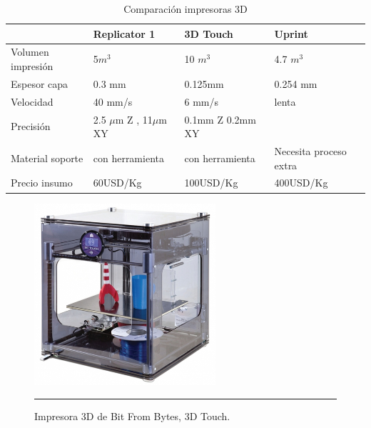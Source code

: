 \begin{table}\small 
    \begin{tabular}{l|lll}
    ~                     & Replicator 1                          & 3D Touch                   & Uprint      \\ \hline
    Volumen impresión         & 5$ m^{3} $                            & 10 $m^{3}$                 & 4.7 $m^{3}$ \\
    Espesor capa      & 0.3 mm                                & 0.125mm                    & 0.254 mm    \\
    Velocidad                 & 40 mm/s                               & 6 mm/s                     & lenta       \\
    Precisión & 2.5 $ \mu $m Z , 11$\mu$m XY  & 0.1mm Z  0.2mm XY  & ~           \\
    Material soporte  & con herramienta &con herramienta  & Necesita proceso extra      \\
    Precio insumo   &60USD/Kg	                          &           100USD/Kg         & 400USD/Kg        \\
    
    \end{tabular}
    \caption {Comparación impresoras 3D}
\end{table}

\begin{figure}[htbp]
	\centering
		\includegraphics[width=0.6\textwidth]{./Figures/3dtouch.jpg}
		\rule{35em}{0.5pt}
	\caption[3DTouch]{Impresora 3D de Bit From Bytes, 3D Touch.}
	\label{fig:3Dtouch}
\end{figure}	


